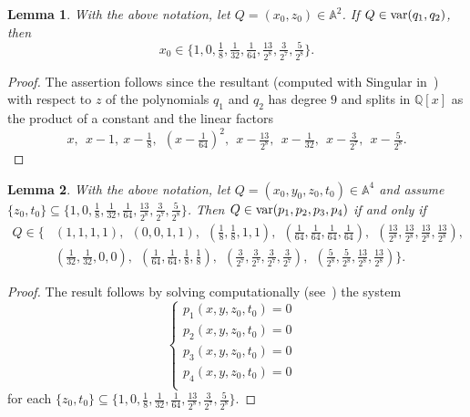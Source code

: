 \documentclass[a4paper]{amsart}
\newtheorem{lemma}{Lemma}[section]
\newcommand{\Var}{{\rm var}}
\newcommand{\Q}{{\mathbb Q}}
\begin{document}
\begin{lemma}\label{solutionsm}
With the above notation, let  $Q=(x_0,z_0)\in \mathbb A^2$. If $Q\in  {\Var} (q_1, q_2)$, then 
$$
x_0\in \{1, 0, \tfrac{1}{8}, \tfrac{1}{32}, \tfrac{1}{64}, \tfrac{13}{2^8}, \tfrac{3}{2^7}, \tfrac{5}{2^8}\}.
$$
\end{lemma}
\begin{proof}
The assertion follows since the resultant (computed with Singular in~\cite[majorana.s]{code}) with respect to $z$ of the polynomials $q_1$ and $q_2$ has degree $9$ and splits in $\Q[x]$ as the product of a constant and the linear factors
$$
x,\:\: x-1,\: x-\tfrac{1}{8},\:\: \left (x-\tfrac{1}{64}\right )^2,\:\: x-\tfrac{13}{2^8},\:\: x-\tfrac{1}{32}, \:\: x-\tfrac{3}{2^7},\: \: x-\tfrac{5}{2^8}.
$$
\end{proof}

\begin{lemma}\label{solgen2}
With the above notation,  let $Q=(x_0, y_0, z_0, t_0)\in \mathbb A^4$ and assume 
$\{z_0, t_0\}\subseteq  \{ 1, 0, \tfrac{1}{8}, \tfrac{1}{32}, \tfrac{1}{64}, \tfrac{13}{2^8}, \tfrac{3}{2^7}, \tfrac{5}{2^8} \}$. Then $Q\in {\Var}(p_1, p_2,p_3, p_4)$  if and only if 
\begin{align*}
Q\in \{&(1,1,1,1),\:\: (0,0,1,1), \:\:\left (\tfrac{1}{8}, \tfrac{1}{8}, 1,1\right ),\:\: \left (\tfrac{1}{64}, \tfrac{1}{64}, \tfrac{1}{64}, \tfrac{1}{64} \right ),\:\:\left (\tfrac{13}{2^8},  \tfrac{13}{2^8}, \tfrac{13}{2^8}, \tfrac{13}{2^8}\right ),\\
&\left (\tfrac{1}{32}, \tfrac{1}{32}, 0,0\right), \:\: \left (\tfrac{1}{64}, \tfrac{1}{64}, \tfrac{1}{8}, \tfrac{1}{8}\right ), \:\:\left (\tfrac{3}{2^7}, \tfrac{3}{2^7}, \tfrac{3}{2^7}, \tfrac{3}{2^7}\right ), \:\: \left  (\tfrac{5}{2^8}, \tfrac{5}{2^8}, \tfrac{13}{2^8}, \tfrac{13}{2^8}\right)\}.
\end{align*}
\end{lemma}
\begin{proof}
The result follows by solving computationally (see~\cite[majorana.s]{code}) the system 
$$
\begin{cases}
p_1(x,y,z_0, t_0)=0 & \\
p_2(x,y,z_0, t_0)=0 & \\
p_3(x,y,z_0, t_0)=0 & \\
p_4(x,y,z_0, t_0)=0 & \\
\end{cases}
$$
for each $\{z_0, t_0\}\subseteq  \{ 1, 0, \tfrac{1}{8}, \tfrac{1}{32}, \tfrac{1}{64}, \tfrac{13}{2^8}, \tfrac{3}{2^7}, \tfrac{5}{2^8} \}$. 
\end{proof}
\end{document}
